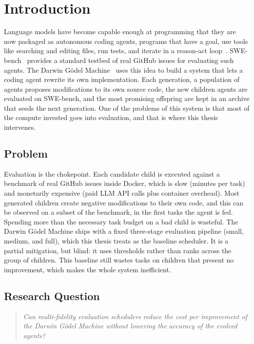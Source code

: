 \chapter{Introduction}
\label{chap:introduction}

Language models have become capable enough at programming that they are
now packaged as autonomous coding agents, programs that have a goal, use
tools like searching and editing files, run tests, and iterate in a
reason-act loop~\cite{Yao:23}.
SWE-bench~\cite{Jimenez:24} provides a standard testbed of real GitHub
issues for evaluating such agents. The Darwin G{\"o}del
Machine~\cite{Sakana:25} uses this idea to build a system that lets a
coding agent rewrite its own implementation. Each generation, a
population of agents proposes modifications to its own source code, the
new children agents are evaluated on SWE-bench, and the most promising
offspring are kept in an archive that seeds the next generation. One of
the problems of this system is that most of the compute invested goes
into evaluation, and that is where this thesis intervenes.

\section{Problem}

Evaluation is the chokepoint. Each candidate child is executed against a
benchmark of real GitHub issues inside Docker, which is slow (minutes
per task) and monetarily expensive (paid LLM API calls plus container
overhead). Most generated children create negative modifications to
their own code, and this can be observed on a subset of the benchmark,
in the first tasks the agent is fed. Spending more than the necessary
task budget on a bad child is wasteful.
The Darwin G{\"o}del Machine ships with a fixed three-stage evaluation
pipeline (small, medium, and full), which this thesis treats as the
baseline scheduler. It is a partial mitigation, but blind: it uses
thresholds rather than ranks across the group of children. This baseline
still wastes tasks on children that present no improvement, which
makes the whole system inefficient.

\section{Research Question}

\begin{quote}
\emph{Can multi-fidelity evaluation schedulers reduce the cost per
improvement of the Darwin G{\"o}del Machine without lowering the
accuracy of the evolved agents?}
\end{quote}


